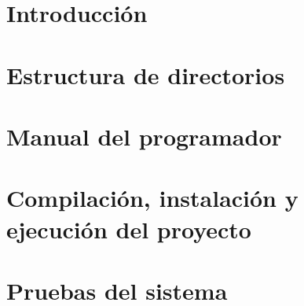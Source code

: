 
\section{Introducción}

\section{Estructura de directorios}

\section{Manual del programador}

\section{Compilación, instalación y ejecución del proyecto}

\section{Pruebas del sistema}
